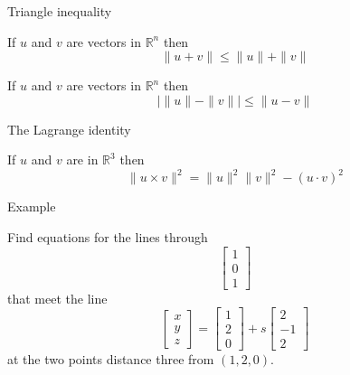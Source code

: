 \documentclass{beamer}
\begin{document}
\begin{frame}{Triangle inequality}
\begin{theorem}
  If $u$ and $v$ are vectors in $\mathbb{R}^n$ then
  \begin{equation*}
    \|u+v\| \leq \|u\|+\|v\|
  \end{equation*}
\end{theorem}\vfill
\begin{theorem}
  If $u$ and $v$ are vectors in $\mathbb{R}^n$ then
  \begin{equation*}
    |\|u\|-\|v\||\leq \|u-v\|
  \end{equation*}
\end{theorem}
\end{frame}

\begin{frame}{The Lagrange identity}
\begin{theorem}
If $u$ and $v$ are in $\mathbb{R}^3$ then
\begin{equation*}
\|u\times v\|^2 = \|u\|^2\|v\|^2-(u\cdot v)^2
\end{equation*}
\end{theorem}
\end{frame}

\begin{frame}{Example}
    \begin{example}
        Find equations for the lines through
        \begin{equation*}
            \left[
            \begin{array}{c}
            1\\
            0\\
            1
            \end{array}
            \right]
        \end{equation*}
        that meet the line
        \begin{equation*}
            \left[
            \begin{array}{c}
            x\\
            y\\
            z
            \end{array}
            \right] = \left[
            \begin{array}{c}
            1\\
            2\\
            0
            \end{array}
            \right]+s \left[
            \begin{array}{c}
            2\\
            -1\\
            2
            \end{array}
            \right]
        \end{equation*}
        at the two points distance three from $(1, 2, 0)$.
    \end{example}
\end{frame}
\end{document}
